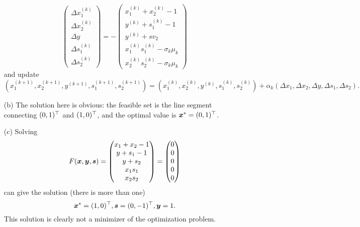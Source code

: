 \documentclass{article}
\begin{document}
\begin{itemize}
\begin{equation*}
                              \begin{pmatrix}
                               \Delta x^{(k)}_1\\ \Delta x^{(k)}_2 \\ \Delta y\\ \Delta s^{(k)}_1 \\ \Delta s^{(k)}_2
                              \end{pmatrix}=
-\begin{pmatrix}
                               x^{(k)}_1+x^{(k)}_2-1\\
                               y^{(k)} +s^{(k)}_1-1\\
                               y^{(k)}+sv_2\\
                               x^{(k)}_1s^{(k)}_1-\sigma_k\mu_k\\
                               x^{(k)}_2s^{(k)}_2-\sigma_k\mu_k
                              \end{pmatrix}
\end{equation*}
and update
\begin{equation*}
 (x_1^{(k+1)},x_2^{(k+1)},y^{(k+1)},s_1^{(k+1)},s_2^{(k+1)}) =  (x_1^{(k)},x_2^{(k)},y^{(k)},s_1^{(k)},s_2^{(k)})+\alpha_k (\Delta x_1,\Delta x_2,\Delta y, \Delta s_1,\Delta s_2).
\end{equation*}
\item[(b)] The solution here is obvious: the feasible set is the line segment connecting $(0,1)^{\top}$ and $(1,0)^{\top}$, and the optimal value is $\bm{x}^*=(0,1)^{\top}$.
\item[(c)] Solving
\begin{equation*}
 F(\bm{x},\bm{y},\bm{s}) = \begin{pmatrix}
                               x_1+x_2-1\\
                               y +s_1-1\\
                               y+s_2\\
                               x_1s_1\\
                               x_2s_2
                              \end{pmatrix}=
                              \begin{pmatrix}
                               0\\0\\0\\0\\0
                              \end{pmatrix}
\end{equation*}
can give the solution (there is more than one)
\begin{equation*}
 \bm{x}^* = (1,0)^{\top}, \bm{s}=(0,-1)^{\top}, \bm{y} = 1.
\end{equation*}
This solution is clearly not a minimizer of the optimization problem.
\end{itemize}
\end{document}
